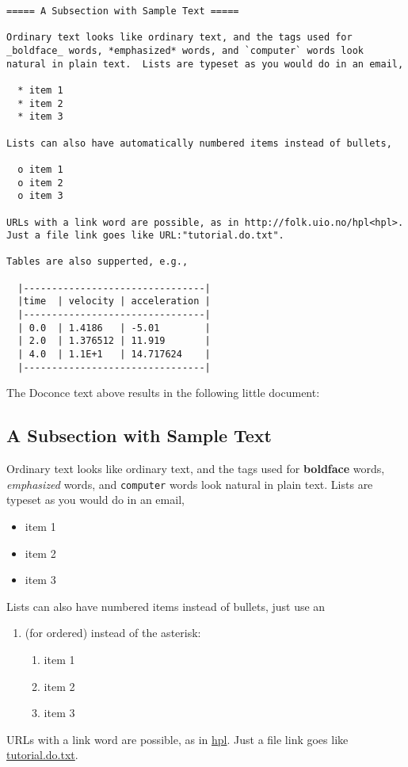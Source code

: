 \documentclass{article}
\begin{document}
\begin{Verbatim}[fontsize=\fontsize{9pt}{9pt},tabsize=8,baselinestretch=0.85,
fontfamily=tt,xleftmargin=7mm]
===== A Subsection with Sample Text =====

Ordinary text looks like ordinary text, and the tags used for
_boldface_ words, *emphasized* words, and `computer` words look
natural in plain text.  Lists are typeset as you would do in an email,

  * item 1
  * item 2
  * item 3

Lists can also have automatically numbered items instead of bullets,

  o item 1
  o item 2
  o item 3

URLs with a link word are possible, as in http://folk.uio.no/hpl<hpl>.
Just a file link goes like URL:"tutorial.do.txt".

Tables are also supperted, e.g.,

  |--------------------------------|
  |time  | velocity | acceleration |
  |--------------------------------|
  | 0.0  | 1.4186   | -5.01        |
  | 2.0  | 1.376512 | 11.919       |
  | 4.0  | 1.1E+1   | 14.717624    |
  |--------------------------------|
\end{Verbatim}
\noindent
The Doconce text above results in the following little document:

\subsection*{A Subsection with Sample Text}

Ordinary text looks like ordinary text, and the tags used for
\textbf{boldface} words, \emph{emphasized} words, and {\fontsize{10pt}{10pt}\verb!computer!} words look
natural in plain text.  Lists are typeset as you would do in an email,

\begin{itemize}
  \item item 1
  \item item 2
  \item item 3

\end{itemize}
Lists can also have numbered items instead of bullets, just use an
\begin{enumerate}
\item (for ordered) instead of the asterisk:

\begin{enumerate}
 \item item 1
 \item item 2
 \item item 3

\end{enumerate}
\end{enumerate}
URLs with a link word are possible, as in \href{http://folk.uio.no/hpl}{hpl}.
Just a file link goes like \href{tutorial.do.txt}{tutorial.do.txt}.
\end{document}
